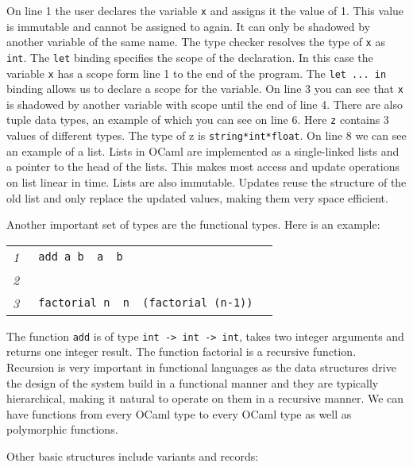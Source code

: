 \documentclass[12pt,twoside,notitlepage]{report}
\newcommand{\mlkeywordA}[1]{\mbox{\color{cyan}{\textbf{\texttt{#1}}}}}
\newcommand{\mlkeyword}[1]{\mbox{\color{red}{#1}}}
\newcommand{\mloperator}[1]{\mbox{\color{darkgreen}{#1}}}
\newcommand{\mlcodeline}[2]{\tiny\sl #1 & \begin{minipage}[c]{0.8\linewidth}\begin{alltt}\mbox{#2}\end{alltt}\end{minipage}\\}
\begin{document}
On line 1 the user declares the variable {\tt x} and assigns it the value of 1.  This value is immutable and cannot be assigned to again.  It can only be shadowed by another variable of the same name. The type checker resolves the type of {\tt x} as {\tt int}. The {\tt let} binding specifies the scope of the declaration. In this case the variable {\tt x} has a scope form line 1 to the end of the program. The {\tt let ... in} binding allows us to declare a scope for the variable. On line 3 you can see that {\tt x} is shadowed by another variable with scope until the end of line 4. There are also tuple data types, an example of which you can see on line 6. Here {\tt z} contains 3 values of different types. The type of z is {\tt string*int*float}. On line 8 we can see an example of a list. Lists in OCaml are implemented as a single-linked lists and a pointer to the head of the lists. This makes most access and update operations on list linear in time. Lists are also immutable. Updates reuse the structure of the old list and only replace the updated values, making them very space efficient.

Another important set of types are the functional types. Here is an example:



{\scriptsize\noindent\begin{longtable}{r|l}
\mlcodeline{1}{\mlkeywordA{let}~add~a~b~\mlkeyword{=}~a~\mloperator{+}~b
}
\mlcodeline{2}{
}
\mlcodeline{3}{\mlkeywordA{let~rec}~factorial~n~\mlkeyword{=}~n~\mloperator{*}~(factorial~(n-1))~~}
\end{longtable}
} 

The function {\tt add} is of type {\tt int -> int -> int}, takes two integer arguments and returns one integer result. The function factorial is a recursive function. Recursion is very important in functional languages as the data structures drive the design of the system build in a functional manner and they are typically hierarchical, making it natural to operate on them in a recursive manner. We can have functions from every OCaml type to every OCaml type as well as polymorphic functions.

Other basic structures include variants and records:


\end{document}
